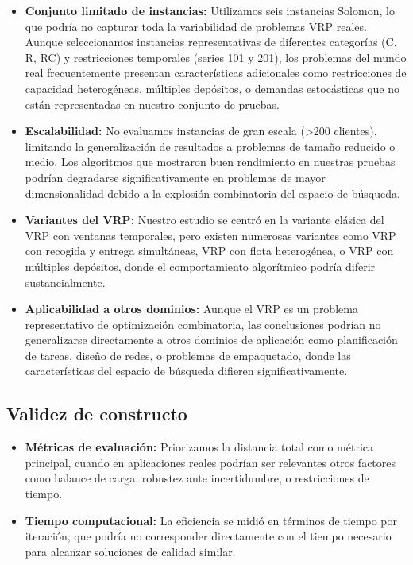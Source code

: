 \documentclass[conference,a4paper]{IEEEtran}
\begin{document}
\begin{itemize}
\item \textbf{Conjunto limitado de instancias:} Utilizamos seis instancias Solomon, lo que podría no capturar toda la variabilidad de problemas VRP reales. Aunque seleccionamos instancias representativas de diferentes categorías (C, R, RC) y restricciones temporales (series 101 y 201), los problemas del mundo real frecuentemente presentan características adicionales como restricciones de capacidad heterogéneas, múltiples depósitos, o demandas estocásticas que no están representadas en nuestro conjunto de pruebas.

\item \textbf{Escalabilidad:} No evaluamos instancias de gran escala (>200 clientes), limitando la generalización de resultados a problemas de tamaño reducido o medio. Los algoritmos que mostraron buen rendimiento en nuestras pruebas podrían degradarse significativamente en problemas de mayor dimensionalidad debido a la explosión combinatoria del espacio de búsqueda.

\item \textbf{Variantes del VRP:} Nuestro estudio se centró en la variante clásica del VRP con ventanas temporales, pero existen numerosas variantes como VRP con recogida y entrega simultáneas, VRP con flota heterogénea, o VRP con múltiples depósitos, donde el comportamiento algorítmico podría diferir sustancialmente.

\item \textbf{Aplicabilidad a otros dominios:} Aunque el VRP es un problema representativo de optimización combinatoria, las conclusiones podrían no generalizarse directamente a otros dominios de aplicación como planificación de tareas, diseño de redes, o problemas de empaquetado, donde las características del espacio de búsqueda difieren significativamente.
\end{itemize}

\subsection{Validez de constructo}

\begin{itemize}
\item \textbf{Métricas de evaluación:} Priorizamos la distancia total como métrica principal, cuando en aplicaciones reales podrían ser relevantes otros factores como balance de carga, robustez ante incertidumbre, o restricciones de tiempo.
\item \textbf{Tiempo computacional:} La eficiencia se midió en términos de tiempo por iteración, que podría no corresponder directamente con el tiempo necesario para alcanzar soluciones de calidad similar.
\end{itemize}
\end{document}
